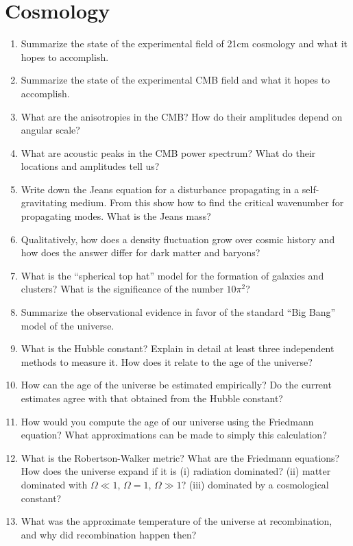 \documentclass[10pt, oneside]{book}
\begin{document}
\section{Cosmology}

\begin{enumerate}[start=126]
    \item Summarize the state of the experimental field of 21cm cosmology and what it hopes to accomplish.
    \item Summarize the state of the experimental CMB field and what it hopes to accomplish.
    \item What are the anisotropies in the CMB? How do their amplitudes depend on angular scale?
    \item What are acoustic peaks in the CMB power spectrum? What do their locations and amplitudes tell us?
    \item Write down the Jeans equation for a disturbance propagating in a self-gravitating medium. From this show how to find the critical wavenumber for propagating modes. What is the Jeans mass?
    \item Qualitatively, how does a density fluctuation grow over cosmic history and how does the answer differ for dark matter and baryons?
    \item What is the ``spherical top hat'' model for the formation of galaxies and clusters? What is the significance of the number $10 \pi^{2}$?
    \item Summarize the observational evidence in favor of the standard ``Big Bang'' model of the universe.
    \item What is the Hubble constant? Explain in detail at least three independent methods to measure it. How does it relate to the age of the universe?
    \item How can the age of the universe be estimated empirically? Do the current estimates agree with that obtained from the Hubble constant?
    \item How would you compute the age of our universe using the Friedmann equation? What approximations can be made to simply this calculation?
    \item What is the Robertson-Walker metric? What are the Friedmann equations? How does the universe expand if it is (i) radiation dominated? (ii) matter dominated with $\Omega \ll 1$, $\Omega = 1$, $\Omega \gg 1$? (iii) dominated by a cosmological constant?
    \item What was the approximate temperature of the universe at recombination, and why did recombination happen then?

\end{enumerate}
\end{document}

